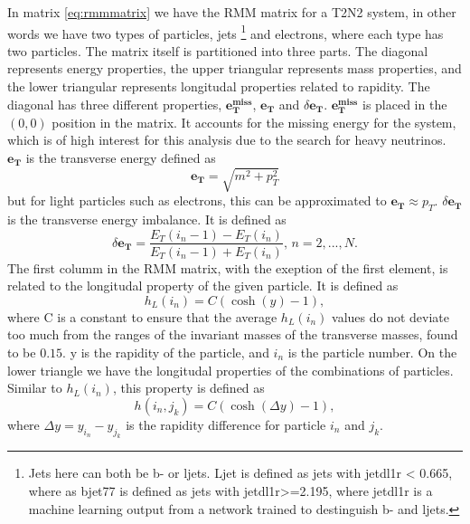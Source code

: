 In matrix \ref{eq:rmmmatrix} we have the RMM matrix for a T2N2 system, in other words we have two types of particles, jets
\footnote{Jets here can both be b- or ljets. Ljet is defined as jets with jetdl1r < 0.665, where as bjet77 is defined as jets with jetdl1r>=2.195, 
where jetdl1r is a machine learning output from a network trained to destinguish b- and ljets.} and electrons, where each type has two particles. 
The matrix itself is partitioned into three parts. 
The diagonal represents energy properties, the upper triangular represents mass properties, and the lower triangular represents longitudal 
properties related to rapidity. The diagonal has three different properties, $\boldsymbol{e_T^{miss}}$, $\boldsymbol{e_T}$ and $\delta\boldsymbol{e_T}$. 
$\boldsymbol{e_T^{miss}}$ is placed in the $(0,0)$ position in the matrix. It accounts for the missing energy for the system, which is of high interest 
for this analysis due to the search for heavy neutrinos. $\boldsymbol{e_T}$ is the transverse energy defined as 
\begin{equation}\label{eq:et}
    \boldsymbol{e_T} = \sqrt{m^2 + p_T^2}
\end{equation}
but for light particles such as electrons, this can be approximated to $\boldsymbol{e_T} \approx p_T$. $\delta\boldsymbol{e_T}$ 
is the transverse energy imbalance. It is defined as 
\begin{equation}\label{eq:deltaet}
    \delta\boldsymbol{e_T} = \frac{E_T(i_n-1) - E_T(i_n)}{E_T(i_n-1) + E_T(i_n)}, \, n = 2, ..., N.
\end{equation}
The first columm in the RMM matrix, with the exeption of the first element, is related to the longitudal property of the given particle. 
It is defined as
\begin{equation*}
    h_L(i_n) = C(\cosh{(y)} - 1),
\end{equation*}
where C is a constant to ensure that the average $h_L(i_n)$ values do not deviate too much from the ranges of the invariant masses 
of the transverse masses, found to be $0.15$\cite{Chekanov_2019}. y is the rapidity of the particle, and $i_n$ is the particle number. 
On the lower triangle we have the longitudal properties of the combinations of particles. Similar to $h_L(i_n)$, this property is defined as 
\begin{equation*}
    h(i_n, j_k) = C(\cosh{(\Delta y)} - 1),
\end{equation*}
where $\Delta y = y_{i_n} - y_{j_k}$ is the rapidity difference for particle $i_n$ and $j_k$. 

